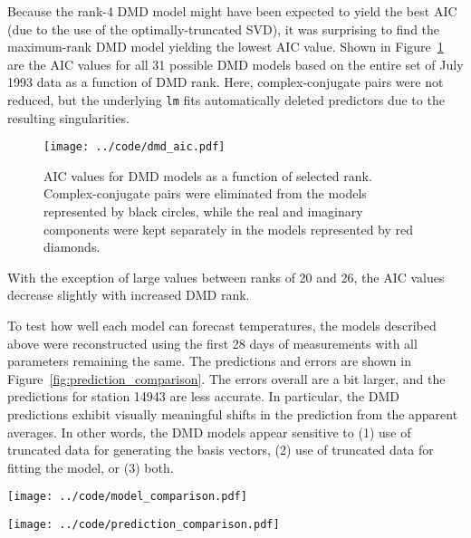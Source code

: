 \documentclass[review,number,sort&compress,12pt]{elsarticle}
\begin{document}
Because the rank-4 DMD model might have been expected to yield the best AIC (due to the use of the optimally-truncated SVD), it was surprising to find the maximum-rank DMD model yielding the lowest AIC value.  Shown in Figure~\ref{fig:dmd_aic} are the AIC values for all 31 possible DMD models based on the entire set of July 1993 data as a function of DMD rank.  Here, complex-conjugate pairs were not reduced, but the underlying {\tt lm} fits automatically deleted predictors due to the resulting singularities.
\begin{figure}[ht]
 \centering
 \texttt{[image: ../code/dmd\_aic.pdf]}\\
   \caption{AIC values for DMD models as a function of selected rank.  Complex-conjugate pairs were eliminated from the models represented by black circles, while the real and imaginary components were kept separately in the models represented by red diamonds.}
  \label{fig:dmd_aic}
\end{figure}
With the exception of large values between ranks of 20 and 26, the AIC values decrease slightly with increased DMD rank. 


To test how well each model can forecast temperatures, the models described above were reconstructed using the first 28 days of measurements with all parameters remaining the same.  
The predictions and errors are shown in Figure~\ref{fig:prediction_comparison}.
The errors overall are a bit larger, and the predictions for station 14943 are less accurate.
In particular, the DMD predictions exhibit visually meaningful shifts in the prediction from the apparent averages.
In other words, the DMD models appear sensitive to (1) use of truncated data for generating the basis vectors, (2) use of truncated data for fitting the model, or (3) both.

\begin{figure*}[h]
 \centering
 \texttt{[image: ../code/model\_comparison.pdf]}\\
   \caption{Predicted temperatures at all space-time points (left) with corresponding errors (center). Also shown are measured values with predictions and 95\% prediction intervals at station 14943.}
  \label{fig:model_comparison}
\end{figure*}

\begin{figure*}[h]
 \centering
 \texttt{[image: ../code/prediction\_comparison.pdf]}\\
   \caption{Same as Figure~\ref{fig:model_comparison} but each model was constructed using only the first 28 days of measurements.}
  \label{fig:prediction_comparison}
\end{figure*}
\end{document}
